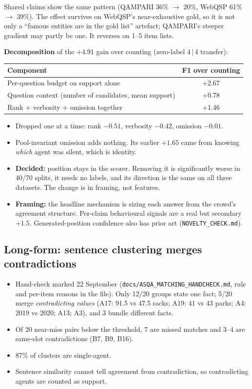 \documentclass[11pt]{article}
\newcommand{\code}[1]{\texttt{#1}}
\begin{document}
Shared claims show the same pattern (QAMPARI 36\% $\to$ 20\%, WebQSP 61\%
$\to$ 39\%). The effect survives on WebQSP's near-exhaustive gold, so it is
not only a ``famous entities are in the gold list'' artefact; QAMPARI's
steeper gradient may partly be one. It reverses on 1--5 item lists.

\textbf{Decomposition} of the $+4.91$ gain over counting (zero-label 4\,$|$\,4
transfer):

\begin{center}
\begin{tabular}{lc}
\toprule
Component & F1 over counting \\
\midrule
Per-question budget on support alone & +2.67 \\
Question context (number of candidates, mean support) & +0.78 \\
Rank + verbosity + omission together & +1.46 \\
\bottomrule
\end{tabular}
\end{center}

\begin{itemize}
  \item Dropped one at a time: rank $-0.51$, verbosity $-0.42$, omission $-0.01$.
  \item Pool-invariant omission adds nothing. Its earlier $+1.65$ came from
        knowing \emph{which} agent was silent, which is identity.
  \item \textbf{Decided:} position stays in the scorer. Removing it is
        significantly worse in 40/70 splits, it needs no labels, and its
        direction is the same on all three datasets. The change is in framing,
        not features.
  \item \textbf{Framing:} the headline mechanism is sizing each answer from the
        crowd's agreement structure. Per-claim behavioural signals are a real but
        secondary $+1.5$. Generated-position confidence also has prior art
        (\code{NOVELTY\_CHECK.md}).
\end{itemize}

\subsection{Long-form: sentence clustering merges contradictions}
\begin{itemize}
  \item Hand-check marked 22 September (\code{docs/ASQA\_MATCHING\_HANDCHECK.md},
        rule and per-item reasons in the file). Only 12/20 groups state one
        fact; 5/20 merge \emph{contradicting values} (A17: 91.5 vs 47.5 sacks;
        A19: 41 vs 43 parks; A4: 2019 vs 2020; A13; A3), and 3 bundle
        different facts.
  \item Of 20 near-miss pairs below the threshold, 7 are missed matches and
        3--4 are same-slot contradictions (B7, B9, B16).
  \item 87\% of clusters are single-agent.
  \item Sentence similarity cannot tell agreement from contradiction, so
        contradicting agents are counted as support.
\end{itemize}
\end{document}
